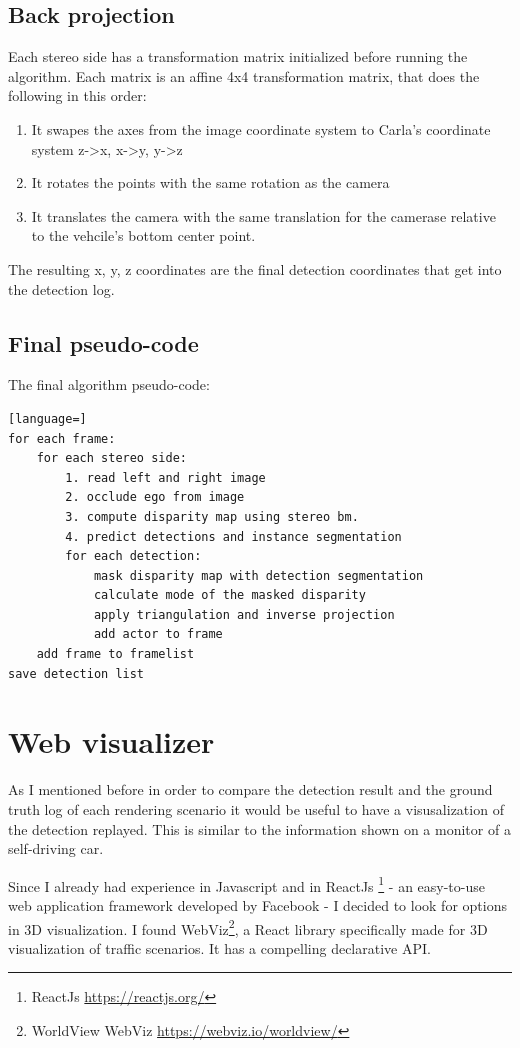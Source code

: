 \subsection{Back projection}
Each stereo side has a transformation matrix initialized before running the
algorithm. Each matrix is an affine 4x4 transformation matrix, that does the
following in this order: 
\begin{enumerate}
    \item It swapes the axes from the image coordinate system to Carla's coordinate system z->x, x->y, y->z
    \item It rotates the points with the same rotation as the camera
    \item It translates the camera with the same translation for the camerase relative to the vehcile's bottom center point.
  \end{enumerate}

The resulting x, y, z coordinates are the final detection coordinates that get into the detection log.

\subsection{Final pseudo-code}
The final algorithm pseudo-code:
\begin{lstlisting}[language=]
for each frame:
    for each stereo side:
        1. read left and right image
        2. occlude ego from image
        3. compute disparity map using stereo bm.
        4. predict detections and instance segmentation
        for each detection:
            mask disparity map with detection segmentation
            calculate mode of the masked disparity
            apply triangulation and inverse projection
            add actor to frame
    add frame to framelist
save detection list
\end{lstlisting}

\section{Web visualizer}
As I mentioned before in order to compare the detection result and the ground
truth log of each rendering scenario it would be useful to have a visusalization
of the detection replayed. This is similar to the information shown on a monitor
of a self-driving car.

Since I already had experience in Javascript and in ReactJs \footnote{ReactJs
    \url{https://reactjs.org/}} - an easy-to-use web application framework
developed by Facebook - I decided to look for options in 3D visualization. I
found WebViz\footnote{WorldView WebViz \url{https://webviz.io/worldview/}}, a
React library specifically made for 3D visualization of traffic scenarios. It
has a compelling declarative API.

